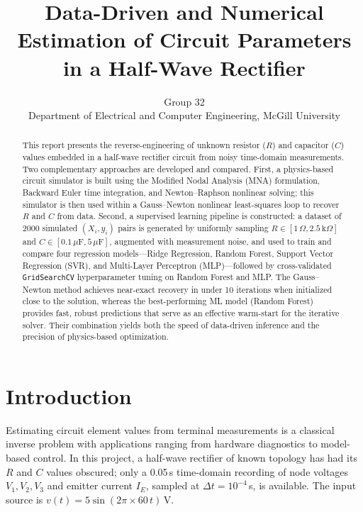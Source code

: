 \documentclass[journal,twocolumn]{IEEEtran}
\title{Data-Driven and Numerical Estimation of Circuit Parameters\\in a Half-Wave Rectifier}
\author{Group 32\\
Department of Electrical and Computer Engineering, McGill University}
\begin{document}
\maketitle

\begin{abstract}
This report presents the reverse-engineering of unknown resistor ($R$) and capacitor ($C$) values embedded in a half-wave rectifier circuit from noisy time-domain measurements. Two complementary approaches are developed and compared. First, a physics-based circuit simulator is built using the Modified Nodal Analysis (MNA) formulation, Backward Euler time integration, and Newton--Raphson nonlinear solving; this simulator is then used within a Gauss--Newton nonlinear least-squares loop to recover $R$ and $C$ from data. Second, a supervised learning pipeline is constructed: a dataset of 2000 simulated $(X_i, y_i)$ pairs is generated by uniformly sampling $R \in [1\,\Omega, 2.5\,\text{k}\Omega]$ and $C \in [0.1\,\mu\text{F}, 5\,\mu\text{F}]$, augmented with measurement noise, and used to train and compare four regression models---Ridge Regression, Random Forest, Support Vector Regression (SVR), and Multi-Layer Perceptron (MLP)---followed by cross-validated \texttt{GridSearchCV} hyperparameter tuning on Random Forest and MLP. The Gauss--Newton method achieves near-exact recovery in under 10 iterations when initialized close to the solution, whereas the best-performing ML model (Random Forest) provides fast, robust predictions that serve as an effective warm-start for the iterative solver. Their combination yields both the speed of data-driven inference and the precision of physics-based optimization.
\end{abstract}

\section{Introduction}

Estimating circuit element values from terminal measurements is a classical inverse problem with applications ranging from hardware diagnostics to model-based control. In this project, a half-wave rectifier of known topology has had its $R$ and $C$ values obscured; only a 0.05\,s time-domain recording of node voltages $V_1, V_2, V_3$ and emitter current $I_E$, sampled at $\Delta t = 10^{-4}$\,s, is available. The input source is $v(t)=5\sin(2\pi \times 60\,t)$\,V.
\end{document}
